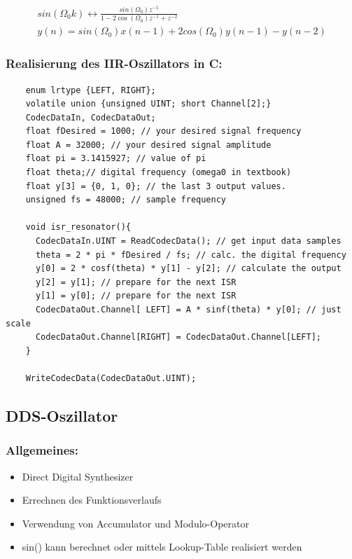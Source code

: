 \documentclass[10pt,a4paper]{article}
\begin{document}
  \begin{mdframed}[style=exercise]
    \begin{align}
    sin(\Omega_0 k) \leftrightarrow \frac{sin(\Omega_0)z^{-1}}{1-2\cos(\Omega_0)z^{-1}+z^{-2}}\\
    y(n) = sin(\Omega_0)x(n-1)+2cos(\Omega_0)y(n-1)-y(n-2)
    \end{align}
  \end{mdframed}

\subsubsection{Realisierung des IIR-Oszillators in C:}
  \begin{verbatim}
    enum lrtype {LEFT, RIGHT};
    volatile union {unsigned UINT; short Channel[2];}
    CodecDataIn, CodecDataOut;
    float fDesired = 1000; // your desired signal frequency
    float A = 32000; // your desired signal amplitude
    float pi = 3.1415927; // value of pi
    float theta;// digital frequency (omega0 in textbook)
    float y[3] = {0, 1, 0}; // the last 3 output values.
    unsigned fs = 48000; // sample frequency

    void isr_resonator(){
      CodecDataIn.UINT = ReadCodecData(); // get input data samples
      theta = 2 * pi * fDesired / fs; // calc. the digital frequency
      y[0] = 2 * cosf(theta) * y[1] - y[2]; // calculate the output
      y[2] = y[1]; // prepare for the next ISR
      y[1] = y[0]; // prepare for the next ISR
      CodecDataOut.Channel[ LEFT] = A * sinf(theta) * y[0]; // just scale
      CodecDataOut.Channel[RIGHT] = CodecDataOut.Channel[LEFT];
    }

    WriteCodecData(CodecDataOut.UINT);  
  \end{verbatim}

\subsection{DDS-Oszillator}
\subsubsection{Allgemeines:}
\begin{itemize}
  \item Direct Digital Synthesizer
  \item Errechnen des Funktionsverlaufs
  \item Verwendung von Accumulator und Modulo-Operator
  \item sin() kann berechnet oder mittels Lookup-Table realisiert werden
\end{itemize}
\end{document}
